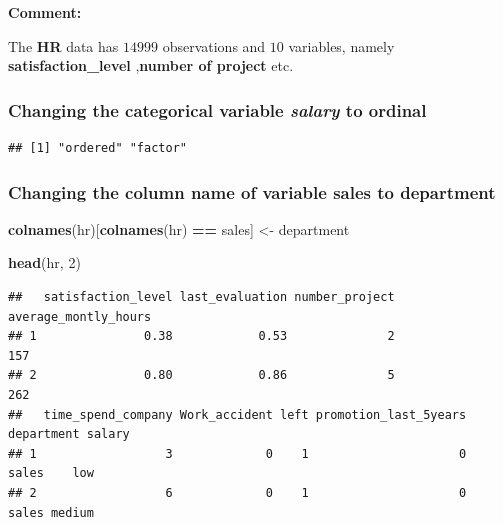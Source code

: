 \documentclass[
  11pt,
]{article}
\newenvironment{Shaded}{\begin{snugshade}}{\end{snugshade}}
\newcommand{\AttributeTok}[1]{\textcolor[rgb]{0.13,0.29,0.53}{#1}}
\newcommand{\ConstantTok}[1]{\textcolor[rgb]{0.56,0.35,0.01}{#1}}
\newcommand{\DecValTok}[1]{\textcolor[rgb]{0.00,0.00,0.81}{#1}}
\newcommand{\FunctionTok}[1]{\textcolor[rgb]{0.13,0.29,0.53}{\textbf{#1}}}
\newcommand{\NormalTok}[1]{#1}
\newcommand{\OtherTok}[1]{\textcolor[rgb]{0.56,0.35,0.01}{#1}}
\newcommand{\SpecialCharTok}[1]{\textcolor[rgb]{0.81,0.36,0.00}{\textbf{#1}}}
\newcommand{\StringTok}[1]{\textcolor[rgb]{0.31,0.60,0.02}{#1}}
\begin{document}
\textbf{Comment:}

The \textbf{HR} data has \(14999\) observations and \(10\) variables,
namely \textbf{satisfaction\_level} ,\textbf{number of project} etc.

\subsubsection{Changing the categorical variable \textit{salary} to ordinal}

\begin{Shaded}
\end{Shaded}

\begin{verbatim}
## [1] "ordered" "factor"
\end{verbatim}

\newpage
\subsubsection{Changing the column name of variable sales to department}

\begin{Shaded}
\begin{Highlighting}[]
\FunctionTok{colnames}\NormalTok{(hr)[}\FunctionTok{colnames}\NormalTok{(hr) }\SpecialCharTok{==} \StringTok{\textquotesingle{}sales\textquotesingle{}}\NormalTok{] }\OtherTok{\textless{}{-}} \StringTok{\textquotesingle{}department\textquotesingle{}}
  
\FunctionTok{head}\NormalTok{(hr, }\DecValTok{2}\NormalTok{)}
\end{Highlighting}
\end{Shaded}

\begin{verbatim}
##   satisfaction_level last_evaluation number_project average_montly_hours
## 1               0.38            0.53              2                  157
## 2               0.80            0.86              5                  262
##   time_spend_company Work_accident left promotion_last_5years department salary
## 1                  3             0    1                     0      sales    low
## 2                  6             0    1                     0      sales medium
\end{verbatim}
\end{document}
